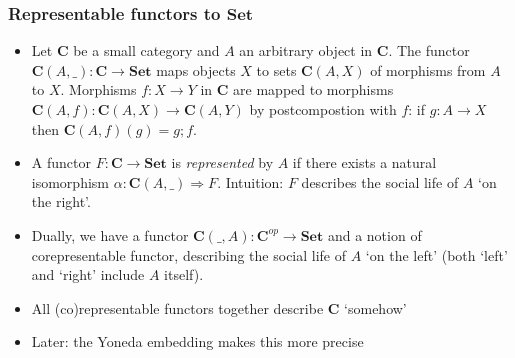 \documentclass[handout]{beamer}
\newcommand{\To}{\Rightarrow}
\newcommand{\bfsf}[1]{{\boldsymbol{#1}}}
\newcommand{\Set}{\bfsf{Set}}
\newcommand{\CC}{\bfsf{C}}
\begin{document}
\frame
  {   
    \frametitle{Representable functors to $\Set$}\label{Yon:ReprFun}

 \begin{itemize}[<+->]
\item Let $\CC$ be a small category and $A$ an arbitrary object in $\CC$. 
The functor  $\CC(A,\_):\CC\to\Set$ maps objects $X$ to sets $\CC(A,X)$
of morphisms from $A$ to $X$. Morphisms $f: X\to Y$ in $\CC$ are
mapped to morphisms $\CC(A,f): \CC(A,X)\to\CC(A,Y)$ by
postcompostion with $f$: if $g:A\to X$ then $\CC(A,f)(g) = g;f$.
\item A functor $F:\CC\to\Set$ is \emph{represented} by $A$ if
there exists a natural isomorphism $\alpha: \CC(A,\_)\To F$.
Intuition: $F$ describes the social life of $A$ `on the right'.
\item Dually, we have a functor $\CC(\_,A):\CC^{op}\to\Set$
and a notion of corepresentable functor, 
describing the social life of $A$ `on the left' 
(both `left' and `right' include $A$ itself).
\item All (co)representable functors together describe $\CC$ `somehow'
\item Later: the Yoneda embedding makes this more precise

\end{itemize}

 }
\end{document}

